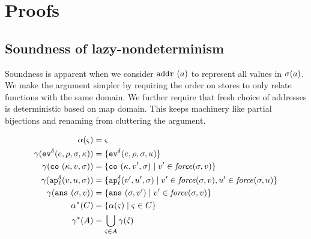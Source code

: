 \documentclass{llncs}
\newcommand{\setof}[1]{\{ #1 \}}
\begin{document}
\section{Proofs}

\subsection{Soundness of lazy-nondeterminism}
Soundness is apparent when we consider ${\tt addr{\ }}({a})$ to represent all
values in $\sigma(a)$. We make the argument simpler by requiring
the order on stores to only relate functions with the same domain. We
further require that fresh choice of addresses is deterministic based
on map domain. This keeps machinery like partial bijections and
renaming from cluttering the argument.

\begin{align*}
\alpha(\mstate) &= \mstate \\
\gamma(\ev[^\mcntr]{\mexp, \menv, \msto, \mkont}) &= \setof{\ev[^\mcntr]{\mexp, \menv, \msto, \mkont}} \\
\gamma(\co{\mkont, \mval, \msto}) &= \setof{\co{\mkont, \mval', \msto} \mid \mval' \in \force(\msto,\mval)} \\
\gamma(\ap[_\mlab^\mcntr]{\mval, \mvalx{u}, \msto}) &= \setof{\ap[_\mlab^\mcntr]{\mval', \mvalx{u}', \msto} \mid \mval' \in \force(\msto,\mval), \mvalx{u}' \in \force(\msto,\mvalx{u})} \\
\gamma(\ans{\msto, \mval}) &= \setof{\ans{\msto, \mval'} \mid \mval' \in \force(\msto,\mval)} \\
\alpha^*(C) &= \setof{\alpha(\mstate) \mid \mstate \in C} \\
\gamma^*(A) &= \bigcup\limits_{\hat{\mstate} \in A}{\gamma(\hat{\mstate})}
\end{align*}
\end{document}
